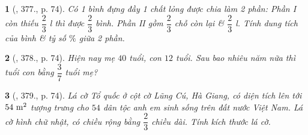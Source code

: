 \documentclass{article}
\newtheorem{baitoan}{}
\begin{document}
\begin{baitoan}[\cite{Tuyen_Toan_6}, 377., p. 74]
	Có 1 bình đựng đầy 1 chất lỏng được chia làm 2 phần: Phần I còn thiếu $\dfrac{2}{3}$ {\rm l} thì được $\dfrac{2}{3}$ bình. Phần II gồm $\dfrac{2}{3}$ chỗ còn lại \& $\dfrac{2}{3}$ {\rm l}. Tính dung tích của bình \& tỷ số $\%$ giữa 2 phần.
\end{baitoan}

\begin{baitoan}[\cite{Tuyen_Toan_6}, 378., p. 74]
	Hiện nay mẹ $40$ tuổi, con $12$ tuổi. Sau bao nhiêu năm nữa thì tuổi con bằng $\dfrac{3}{7}$ tuổi mẹ?
\end{baitoan}

\begin{baitoan}[\cite{Tuyen_Toan_6}, 379., p. 74]
	Lá cờ Tổ quốc ở cột cờ Lũng Cú, Hà Giang, có diện tích lên tới $\rm54\ m^2$ tượng trưng cho $54$ dân tộc anh em sinh sống trên đất nước Việt Nam. Lá cờ hình chữ nhật, có chiều rộng bằng $\dfrac{2}{3}$ chiều dài. Tính kích thước lá cờ.
\end{baitoan}


\printbibliography[heading=bibintoc]
	
\end{document}

